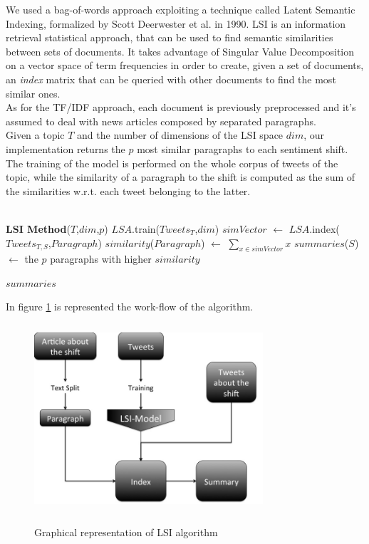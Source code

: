 We used a bag-of-words approach exploiting a technique called Latent Semantic Indexing, formalized by Scott Deerwester et al. in 1990\cite{LSA}. LSI is an information retrieval statistical approach, that can be used to find semantic similarities between sets of documents. It takes advantage of Singular Value Decomposition on a vector space of term frequencies in order to create, given a set of documents, an \emph{index} matrix that can be queried with other documents to find the most similar ones.
\\
As for the TF/IDF approach, each document is previously preprocessed and it's assumed to deal with news articles composed by separated paragraphs.
\\
Given a topic $T$ and the number of dimensions of the LSI space $dim$, our implementation returns the $p$ most similar paragraphs to each sentiment shift. The training of the model is performed on the whole corpus of tweets of the topic, while the similarity of a paragraph to the shift is computed as the sum of the similarities w.r.t. each tweet belonging to the latter.
\\\\
\begin{algorithmic}
\STATE \textbf{LSI Method}($T$,$dim$,$p$)
\STATE
\STATE $LSA$.train($Tweets_T$,$dim$)
\STATE
{}
			\STATE $simVector$ $\leftarrow$ $LSA$.index($Tweets_{T,S}$,$Paragraph$)
			\STATE $similarity$($Paragraph$) $\leftarrow$ $\sum_{x \in simVector} x $
		\ENDFOR
	\ENDFOR
	\STATE $summaries$($S$) $\leftarrow$ the $p$ paragraphs with higher $similarity$

\ENDFOR
\STATE
\RETURN $summaries$

In figure \ref{fig:LSI} is represented the work-flow of the algorithm. 

\begin{figure}[htbp]
	\centering
			{\includegraphics[width=8.5cm,height=7cm]{image/LSI.jpg}}	
		\caption[LSI]{Graphical representation of LSI algorithm}
	\label{fig:LSI}
\end{figure} 

\end{algorithmic}
